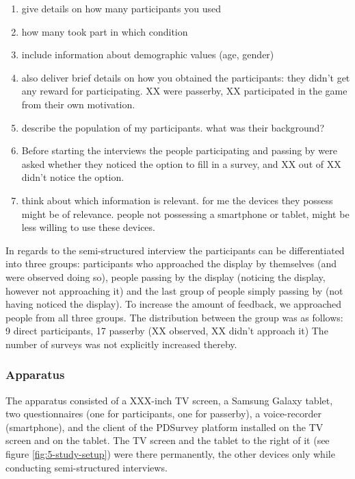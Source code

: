 		\begin{enumerate}
		\item give details on how many participants you used
		\item how many took part in which condition
		\item include information about demographic values (age, gender)
		\item also deliver brief details on how you obtained the participants: they didn't get any reward for participating. XX were passerby, XX participated in the game from their own motivation.
		\item describe the population of my participants. what was their background?
		\item  Before starting the interviews the people participating and passing by were asked whether they noticed the option to fill in a survey, and XX out of XX didn't notice the option. 
		\item think about which information is relevant. for me the devices they possess might be of relevance. people not possessing a smartphone or tablet, might be less willing to use these devices.  
		\end{enumerate}



		In regards to the semi-structured interview the participants can be differentiated into three groups: participants who approached the display by themselves (and were observed doing so), people passing by the display (noticing the display, however not approaching it) and the last group of people simply passing by (not having noticed the display). To increase the amount of feedback, we approached people from all three groups. The distribution between the group was as follows: 9 direct participants, 17 passerby (XX observed, XX didn't approach it)
		The number of surveys was not explicitly increased thereby.




	\subsubsection{Apparatus}
	\label{sec:field-study:apparatus}

		The apparatus consisted of a XXX-inch TV screen, a Samsung Galaxy tablet, two questionnaires (one for participants, one for passerby), a voice-recorder (smartphone), and the client of the PDSurvey platform installed on the TV screen and on the tablet. The TV screen and the tablet to the right of it (see figure \ref{fig:5-study-setup}) were there permanently, the other devices only while conducting semi-structured interviews.


